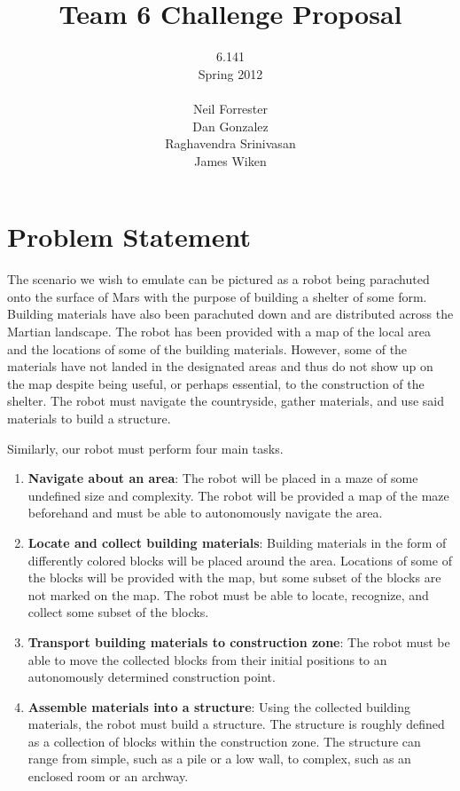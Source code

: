 \documentclass[letterpaper,12pt]{article}
\title{Team 6 Challenge Proposal}
\author{6.141\\
	Spring 2012\\ \\
	Neil Forrester\\
	Dan Gonzalez\\
	Raghavendra Srinivasan\\
	James Wiken}
\begin{document}
\begin{singlespacing}
\maketitle
\thispagestyle{empty}
\newpage

\tableofcontents
\listoffigures
\listoftables
\thispagestyle{empty}
\newpage

\end{singlespacing}

\setcounter{page}{1}

\section{Problem Statement}
The scenario we wish to emulate can be pictured as a robot being parachuted onto the surface of Mars with the purpose of building a shelter of some form.  Building materials have also been parachuted down and are distributed across the Martian landscape.  The robot has been provided with a map of the local area and the locations of some of the building materials.  However, some of the materials have not landed in the designated areas and thus do not show up on the map despite being useful, or perhaps essential, to the construction of the shelter.  The robot must navigate the countryside, gather materials, and use said materials to build a structure.

Similarly, our robot must perform four main tasks.  

\begin{enumerate}
 \item {\bf Navigate about an area}: The robot will be placed in a maze of some undefined size and complexity.  The robot will be provided a map of the maze beforehand and must be able to autonomously navigate the area.
 \item {\bf Locate and collect building materials}: Building materials in the form of differently colored blocks will be placed around the area.  Locations of some of the blocks will be provided with the map, but some subset of the blocks are not marked on the map.  The robot must be able to locate, recognize, and collect some subset of the blocks.
 \item {\bf Transport building materials to construction zone}: The robot must be able to move the collected blocks from their initial positions to an autonomously determined construction point.
 \item {\bf Assemble materials into a structure}: Using the collected building materials, the robot must build a structure.  The structure is roughly defined as a collection of blocks within the construction zone.  The structure can range from simple, such as a pile or a low wall, to complex, such as an enclosed room or an archway.  
\end{enumerate}
\end{document}
